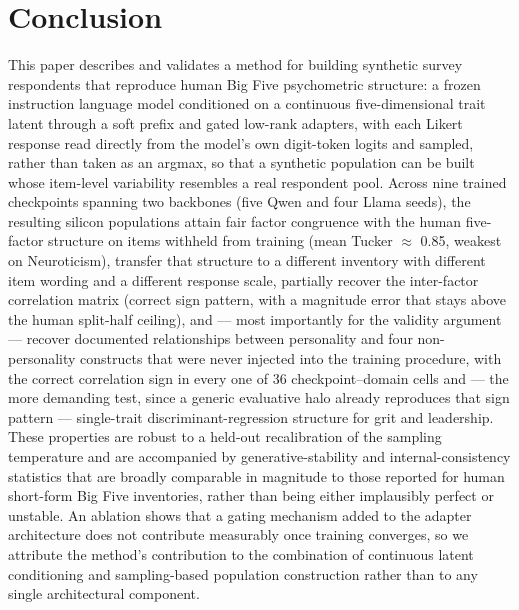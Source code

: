 \documentclass[11pt]{article}
\begin{document}
\section{Conclusion}

This paper describes and validates a method for building synthetic survey respondents that reproduce human Big Five psychometric structure: a frozen instruction language model conditioned on a continuous five-dimensional trait latent through a soft prefix and gated low-rank adapters, with each Likert response read directly from the model's own digit-token logits and sampled, rather than taken as an argmax, so that a synthetic population can be built whose item-level variability resembles a real respondent pool. Across nine trained checkpoints spanning two backbones (five Qwen and four Llama seeds), the resulting silicon populations attain fair factor congruence with the human five-factor structure on items withheld from training (mean Tucker $\approx$ 0.85, weakest on Neuroticism), transfer that structure to a different inventory with different item wording and a different response scale, partially recover the inter-factor correlation matrix (correct sign pattern, with a magnitude error that stays above the human split-half ceiling), and — most importantly for the validity argument — recover documented relationships between personality and four non-personality constructs that were never injected into the training procedure, with the correct correlation sign in every one of 36 checkpoint–domain cells and — the more demanding test, since a generic evaluative halo already reproduces that sign pattern — single-trait discriminant-regression structure for grit and leadership. These properties are robust to a held-out recalibration of the sampling temperature and are accompanied by generative-stability and internal-consistency statistics that are broadly comparable in magnitude to those reported for human short-form Big Five inventories, rather than being either implausibly perfect or unstable. An ablation shows that a gating mechanism added to the adapter architecture does not contribute measurably once training converges, so we attribute the method's contribution to the combination of continuous latent conditioning and sampling-based population construction rather than to any single architectural component.
\end{document}
